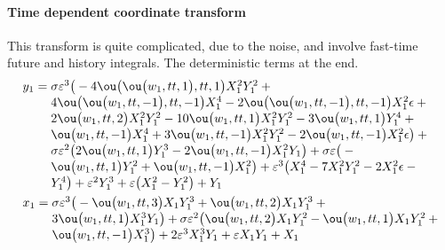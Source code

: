 \paragraph{Time dependent coordinate transform}
This transform is quite complicated, due to the noise, and involve fast-time future and history integrals. 
The deterministic terms at the end.
\begin{align*}&
y_{1}=\ParMath{\sigma  \eps^{3} \big(-4 \ou\big(\ou\big(w_{1},tt,1\big),tt,1\big)
 X_{1}^{2} Y_{1}^{2}+4 \ou\big(\ou\big(w_{1},tt,-1\big),tt,-1\big) X_{1}
^{4}-2 \ou\big(\ou\big(w_{1},tt,-1\big),tt,-1\big) X_{1}^{2} \epsilon +2
 \ou\big(w_{1},tt,2\big) X_{1}^{2} Y_{1}^{2}-10 \ou\big(w_{1},tt,1\big) 
X_{1}^{2} Y_{1}^{2}-3 \ou\big(w_{1},tt,1\big) Y_{1}^{4}+\ou\big(w_{1},tt
,-1\big) X_{1}^{4}+3 \ou\big(w_{1},tt,-1\big) X_{1}^{2} Y_{1}^{2}-2 \ou
\big(w_{1},tt,-1\big) X_{1}^{2} \epsilon \big)+\sigma  \eps^{2} \big(2 
\ou\big(w_{1},tt,1\big) Y_{1}^{3}-2 \ou\big(w_{1},tt,-1\big) X_{1}^{2} Y
_{1}\big)+\sigma  \eps \big(-\ou\big(w_{1},tt,1\big) Y_{1}^{2}+\ou\big(w
_{1},tt,-1\big) X_{1}^{2}\big)+\eps^{3} \big(X_{1}^{4}-7 X_{1}^{2} Y_{1}
^{2}-2 X_{1}^{2} \epsilon -Y_{1}^{4}\big)+\eps^{2} Y_{1}^{3}+\eps \big(X
_{1}^{2}-Y_{1}^{2}\big)+Y_{1}
}
\\&
x_{1}=\ParMath{\sigma  \eps^{3} \big(-\ou\big(w_{1},tt,3\big) X_{1} Y_{1}^{3}+\ou
\big(w_{1},tt,2\big) X_{1} Y_{1}^{3}+3 \ou\big(w_{1},tt,1\big) X_{1}^{3}
 Y_{1}\big)+\sigma  \eps^{2} \big(\ou\big(w_{1},tt,2\big) X_{1} Y_{1}^{2
}-\ou\big(w_{1},tt,1\big) X_{1} Y_{1}^{2}+\ou\big(w_{1},tt,-1\big) X_{1}
^{3}\big)+2 \eps^{3} X_{1}^{3} Y_{1}+\eps X_{1} Y_{1}+X_{1}
}
\end{align*}

